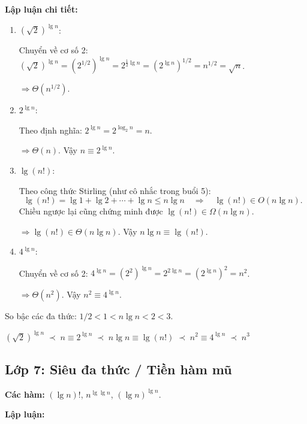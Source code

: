 ﻿\documentclass[12pt,a4paper]{article}
\begin{document}
\textbf{Lập luận chi tiết:}

\begin{enumerate}[label=(\roman*)]
  \item $(\sqrt{2})^{\lg n}$:

  Chuyển về cơ số 2:
  $(\sqrt{2})^{\lg n} = (2^{1/2})^{\lg n} = 2^{\frac{1}{2}\lg n} = (2^{\lg n})^{1/2} = n^{1/2} = \sqrt{n}$.

  $\Longrightarrow \Theta(n^{1/2})$.

  \item $2^{\lg n}$:

  Theo định nghĩa: $2^{\lg n} = 2^{\log_2 n} = n$.

  $\Longrightarrow \Theta(n)$. Vậy $n \equiv 2^{\lg n}$.

  \item $\lg(n!)$:

  Theo công thức Stirling (như cô nhắc trong buổi 5):
  \[
    \lg(n!) = \lg 1 + \lg 2 + \cdots + \lg n \leq n\lg n
    \quad\Longrightarrow\quad \lg(n!) \in O(n\lg n).
  \]
  Chiều ngược lại cũng chứng minh được $\lg(n!) \in \Omega(n\lg n)$.

  $\Longrightarrow \lg(n!) \in \Theta(n\lg n)$. Vậy $n\lg n \equiv \lg(n!)$.

  \item $4^{\lg n}$:

  Chuyển về cơ số 2:
  $4^{\lg n} = (2^2)^{\lg n} = 2^{2\lg n} = (2^{\lg n})^2 = n^2$.

  $\Longrightarrow \Theta(n^2)$. Vậy $n^2 \equiv 4^{\lg n}$.
\end{enumerate}

So bậc các đa thức: $1/2 < 1 < n\lg n < 2 < 3$.

\begin{resultbox}
$(\sqrt{2})^{\lg n}
\;\prec\; n \equiv 2^{\lg n}
\;\prec\; n\lg n \equiv \lg(n!)
\;\prec\; n^2 \equiv 4^{\lg n}
\;\prec\; n^3$
\end{resultbox}

\subsection{Lớp 7: Siêu đa thức / Tiền hàm mũ}

\textbf{Các hàm:} $(\lg n)!$, \;\; $n^{\lg\lg n}$, \;\; $(\lg n)^{\lg n}$.

\textbf{Lập luận:}
\end{document}
